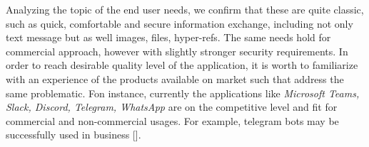 Analyzing the topic of the end user needs, we confirm that these are quite classic, such as
quick, comfortable and secure information exchange, including not only text message but as well
images, files, hyper-refs.
The same needs hold for commercial approach, however with slightly stronger security requirements.
In order to reach desirable quality level of the application, it is worth to familiarize with an
experience of the products available on market such that address the same problematic.
Fon instance, currently the applications like \textit{Microsoft Teams, Slack, Discord, Telegram, WhatsApp}
are on the competitive level and fit for commercial
and non-commercial usages.
For example, telegram bots may be successfully used in business [\cite{ilchenko2017using}].
